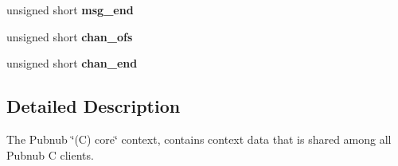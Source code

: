 \begin{DoxyCompactItemize}
\item 
\hypertarget{structpbcc__context_a6ed2f92b3c8d07feac6ab671aa4baba1}{unsigned short {\bfseries msg\-\_\-end}}\label{structpbcc__context_a6ed2f92b3c8d07feac6ab671aa4baba1}

\item 
\hypertarget{structpbcc__context_a44ef1970cb8ac9e04a8c78b90c67d29d}{unsigned short {\bfseries chan\-\_\-ofs}}\label{structpbcc__context_a44ef1970cb8ac9e04a8c78b90c67d29d}

\item 
\hypertarget{structpbcc__context_a6624ae66c229fac910c0f88caebce902}{unsigned short {\bfseries chan\-\_\-end}}\label{structpbcc__context_a6624ae66c229fac910c0f88caebce902}

\end{DoxyCompactItemize}


\subsection{Detailed Description}
The Pubnub \char`\"{}(\-C) core\char`\"{} context, contains context data that is shared among all Pubnub C clients. 

